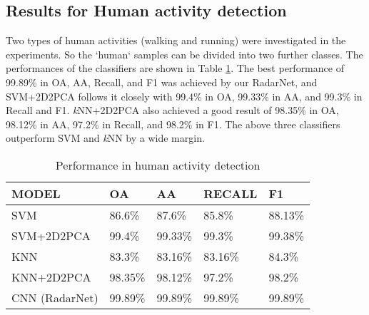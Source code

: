 \subsection{Results for Human activity detection}
Two types of human activities (walking and running) were investigated in the experiments. So the `human` samples can be divided into two further classes. The performances of the classifiers are shown in Table \ref{tb-had}. The best performance of 99.89\% in OA, AA, Recall, and F1 was achieved by our RadarNet, and SVM+2D2PCA follows it closely with 99.4\% in OA, 99.33\% in AA, and 99.3\% in Recall and F1. \textit{k}NN+2D2PCA also achieved a good result of 98.35\% in OA, 98.12\% in AA, 97.2\% in Recall, and 98.2\% in F1. The above three classifiers outperform SVM and \textit{k}NN by a wide margin.
\begin{table}[]
\centering
\caption{Performance in human activity detection}
\label{tb-had}
\begin{tabular}{|l|l|l|l|l|}
\hline
\textbf{MODEL} & \textbf{OA} & \textbf{AA} & \textbf{RECALL} & \textbf{F1} \\ \hline
SVM            & 86.6\%      & 87.6\%      & 85.8\%          & 88.13\%     \\ \hline
SVM+2D2PCA     & 99.4\%      & 99.33\%     & 99.3\%          & 99.38\%     \\ \hline
KNN            & 83.3\%      & 83.16\%     & 83.16\%         & 84.3\%      \\ \hline
KNN+2D2PCA     & 98.35\%     & 98.12\%     & 97.2\%          & 98.2\%      \\ \hline
CNN (RadarNet) & 99.89\%     & 99.89\%     & 99.89\%         & 99.89\%       \\ \hline
\end{tabular}
\end{table}

